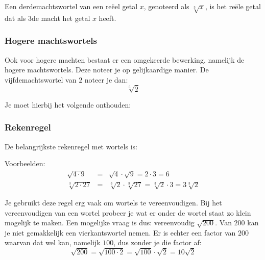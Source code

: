 \begin{definitie}
	Een derdemachtswortel van een re\"eel getal $x$, genoteerd als $\sqrt[3]{x}$, is het re\"ele getal dat als 3de macht het getal $x$ heeft.
\end{definitie}


\subsubsection{Hogere machtswortels}


Ook voor hogere machten bestaat er een omgekeerde bewerking, namelijk de hogere machtswortels. Deze noteer je op gelijkaardige manier. 
De vijfdemachtswortel van $2$ noteer je dan:
\begin{equation*}
\sqrt[5]{2}
\end{equation*}

Je moet hierbij het volgende onthouden:


\subsubsection{Rekenregel}

De belangrijkste rekenregel met wortels is:


Voorbeelden:
\begin{eqnarray*}
\sqrt{4 \cdot 9} &=& \sqrt{4}\cdot \sqrt{9} = 2 \cdot 3 = 6 \\
\sqrt[3]{2 \cdot 27} &=& \sqrt[3]{2} \cdot \sqrt[3]{27} = \sqrt[3]{2} \cdot 3 = 3 \sqrt[3]{2}
\end{eqnarray*}

Je gebruikt deze regel erg vaak om wortels te vereenvoudigen. Bij het vereenvoudigen van een wortel probeer je wat er onder de wortel staat zo klein mogelijk te maken. Een mogelijke vraag is dus: vereenvoudig $\sqrt{200}$. Van $200$ kan je niet gemakkelijk een vierkantswortel nemen. Er is echter een factor van $200$ waarvan dat wel kan, namelijk $100$, dus zonder je die factor af:
\begin{equation*}
\sqrt{200}=\sqrt{100 \cdot 2} = \sqrt{100} \cdot \sqrt{2} = 10\sqrt{2}
\end{equation*}

